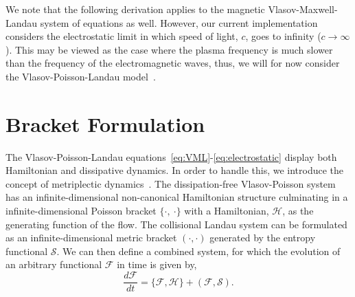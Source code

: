 \documentclass[preprint,12pt]{elsarticle}
\theoremstyle{definition}
\begin{document}
We note that the following derivation applies to the magnetic Vlasov-Maxwell-Landau system of equations as well. However, our current implementation considers the electrostatic limit in which speed of light, $c$, goes to infinity ($c\rightarrow \infty$). This may be viewed as the case where the plasma frequency is much slower than the frequency of the electromagnetic waves, thus, we will for now consider the Vlasov-Poisson-Landau model~\cite{Miloshevich2021}.

\section{Bracket Formulation}\label{sec:BracketFormulation}

The Vlasov-Poisson-Landau equations~\eqref{eq:VML}-\eqref{eq:electrostatic} display both Hamiltonian and dissipative dynamics. In order to handle this, we introduce the concept of metriplectic dynamics~\cite{Morrison1986}. The dissipation-free Vlasov-Poisson system has an infinite-dimensional non-canonical Hamiltonian structure culminating in a infinite-dimensional Poisson bracket $\{\cdot ,~\cdot \}$ with a Hamiltonian, $\mathcal{H}$, as the generating function of the flow. The collisional Landau system can be formulated as an infinite-dimensional metric bracket $( \cdot , \cdot)$ generated by the entropy functional $\mathcal{S}$. We can then define a combined system, for which the evolution of an arbitrary functional $\mathcal{F}$ in time is given by,
\begin{equation}
\frac{d \mathcal{F}}{dt} = \{ \mathcal{F}, \mathcal{H}\} + \left( \mathcal{F}, \mathcal{S} \right). \label{eq:MetriplecticBracket}
\end{equation} 
\end{document}
